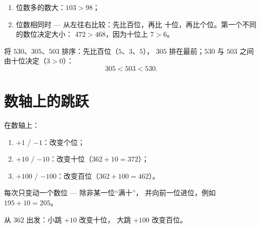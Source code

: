\begin{method}[比较三位数]\label{met:g2:numbers:compare}
\begin{enumerate}
  \item 位数多的数大：$103 > 98$；
  \item 位数相同时 --- 从左往右比较：先比百位，再比
        十位，再比个位。第一个不同的数位决定大小：
        $472 > 468$，因为十位上 $7 > 6$。
\end{enumerate}
\end{method}

\begin{example}\label{ex:g2:numbers:order}
将 $530$、$305$、$503$ 排序：先比百位（$5$、$3$、$5$），
$305$ 排在最前；$530$ 与 $503$ 之间由十位决定（$3 > 0$）：
\[
305 < 503 < 530 .
\]
\end{example}

\section{数轴上的跳跃}

\begin{method}[加整十数与整百数]\label{met:g2:numbers:jumps}
在数轴上：
\begin{enumerate}
  \item $+1$ / $-1$：改变个位；
  \item $+10$ / $-10$：改变十位（$362 + 10 = 372$）；
  \item $+100$ / $-100$：改变百位（$362 + 100 = 462$）。
\end{enumerate}
每次只变动一个数位 --- 除非某一位“满十”，
并向前一位进位，例如 $195 + 10 = 205$。
\end{method}

\begin{omfigure}

{\small 从 $362$ 出发：小跳 $+10$ 改变十位，
大跳 $+100$ 改变百位。}
\end{omfigure}

